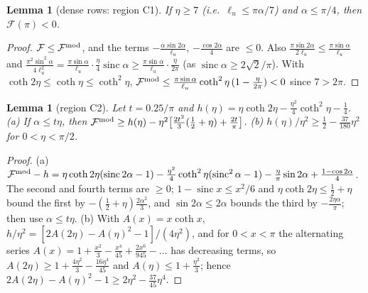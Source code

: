 \documentclass[11pt]{article}
\newtheorem{lemma}[theorem]{Lemma}
\theoremstyle{definition}
\theoremstyle{remark}
\begin{document}
\begin{lemma}[dense rows: region C1]\label{lem:C1}
If $\eta\ge7$ (i.e.\ $\ell_u\le\pi\alpha/7$) and $\alpha\le\pi/4$, then $\mathcal F(\pi)<0$.
\end{lemma}
\begin{proof}
$\mathcal F\le\mathcal F^{\rm mod}$, and the terms $-\frac{\alpha\sin2\alpha}{\ell_u}$, $-\frac{\cos2\alpha}4$ are $\le0$. Also
$\frac{\pi\sin2\alpha}{2\ell_u}\le\frac{\pi\sin\alpha}{\ell_u}$ and $\frac{\pi^2\sin^2\alpha}{4\ell_u^2}=\frac{\pi\sin\alpha}{\ell_u}\cdot\frac\eta4\operatorname{sinc}\alpha\ge\frac{\pi\sin\alpha}{\ell_u}\cdot\frac\eta{2\pi}$
(as $\operatorname{sinc}\alpha\ge2\sqrt2/\pi$). With $\coth2\eta\le\coth\eta\le\coth^2\eta$,
$\mathcal F^{\rm mod}\le\frac{\pi\sin\alpha}{\ell_u}\coth^2\eta\,(1-\frac\eta{2\pi})<0$ since $7>2\pi$.
\end{proof}

\begin{lemma}[region C2]\label{lem:C2}
Let $t=0.25/\pi$ and $h(\eta)=\eta\coth2\eta-\frac{\eta^2}4\coth^2\eta-\frac14$. (a) If $\alpha\le t\eta$, then
$\mathcal F^{\rm mod}\ge h(\eta)-\eta^2\big[\frac{2t^2}3(\frac12+\eta)+\frac{2t}\pi\big]$. (b) $h(\eta)/\eta^2\ge\frac12-\frac{37}{180}\eta^2$ for
$0<\eta<\pi/2$.
\end{lemma}
\begin{proof}
(a) $\mathcal F^{\rm mod}-h=\eta\coth2\eta(\operatorname{sinc}2\alpha-1)-\frac{\eta^2}4\coth^2\eta(\operatorname{sinc}^2\alpha-1)-\frac\eta\pi\sin2\alpha+\frac{1-\cos2\alpha}4$.
The second and fourth terms are $\ge0$; $1-\operatorname{sinc}x\le x^2/6$ and $\eta\coth2\eta\le\frac12+\eta$ bound the first by
$-(\frac12+\eta)\frac{2\alpha^2}3$, and $\sin2\alpha\le2\alpha$ bounds the third by $-\frac{2\eta\alpha}\pi$; then use $\alpha\le t\eta$.
(b) With $A(x)=x\coth x$, $h/\eta^2=[2A(2\eta)-A(\eta)^2-1]/(4\eta^2)$, and for $0<x<\pi$ the alternating series
$A(x)=1+\frac{x^2}3-\frac{x^4}{45}+\frac{2x^6}{945}-\dots$ has decreasing terms, so $A(2\eta)\ge1+\frac{4\eta^2}3-\frac{16\eta^4}{45}$ and
$A(\eta)\le1+\frac{\eta^2}3$; hence $2A(2\eta)-A(\eta)^2-1\ge2\eta^2-\frac{37}{45}\eta^4$.
\end{proof}
\end{document}

